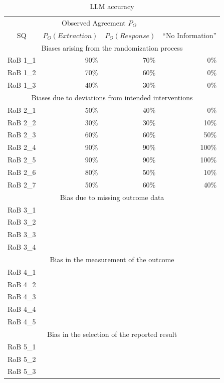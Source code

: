 \documentclass[sn-mathphys,Numbered]{sn-jnl}%
\theoremstyle{thmstyleone}%
\theoremstyle{thmstyletwo}%
\theoremstyle{thmstylethree}%
\begin{document}
\begin{table}[htb]
    \caption{LLM accuracy}
    \label{table:LLM_eval}
    \centering
    \begin{tabular}{crrr}
    \toprule[1.0pt]
     & \multicolumn{2}{c}{Observed Agreement $P_{O}$} \\
        SQ & $P_{O} (Extraction)$ & $P_{O} (Response)$ & ``No Information'' \\ 
    \midrule[1.0pt]
        \multicolumn{4}{c}{Biases arising from the randomization process} \\
        \hline
        RoB 1\_1 & 90\% & 70\% & 0\% \\ 
        RoB 1\_2 & 70\% & 60\% & 0\% \\ 
        RoB 1\_3 & 40\% & 30\% & 0\% \\ 
        \hline
        \multicolumn{4}{c}{Biases due to deviations from intended interventions} \\
        \hline
        RoB 2\_1 & 50\% & 40\% & 0\% \\
        RoB 2\_2 & 30\% & 30\% & 10\% \\ 
        RoB 2\_3 & 60\% & 60\% & 50\% \\ 
        RoB 2\_4 & 90\% & 90\% & 100\% \\ 
        RoB 2\_5 & 90\% & 90\% & 100\% \\ 
        RoB 2\_6 & 80\% & 50\% & 10\% \\ 
        RoB 2\_7 & 50\% & 60\% & 40\% \\
        \hline
        \multicolumn{4}{c}{Bias due to missing outcome data} \\
        \hline
        RoB 3\_1 & & & \\ 
        RoB 3\_2 & & & \\ 
        RoB 3\_3 & & & \\ 
        RoB 3\_4 & & & \\ 
        \hline
        \multicolumn{4}{c}{Bias in the measurement of the outcome} \\
        \hline
        RoB 4\_1 & & & \\ 
        RoB 4\_2 & & & \\ 
        RoB 4\_3 & & & \\ 
        RoB 4\_4 & & & \\ 
        RoB 4\_5 & & & \\ 
        \hline
        \multicolumn{4}{c}{Bias in the selection of the reported result} \\
        \hline
        RoB 5\_1 & & & \\ 
        RoB 5\_2 & & & \\ 
        RoB 5\_3 & & & \\
    \bottomrule[1.0pt]
    \end{tabular}
\end{table}
%
%
%
\end{document}
